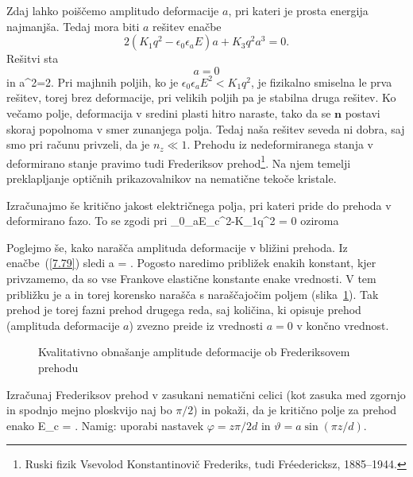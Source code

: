Zdaj lahko poiščemo amplitudo deformacije $a$, pri kateri je prosta energija
najmanjša. Tedaj mora biti $a$ rešitev enačbe 
\begin{equation}
2(K_{1}q^{2}-\epsilon_{0}\epsilon_{a}E)a+K_{3}q^{2}a^{3}=0.
\label{7.78}
\end{equation}
 Rešitvi sta 
\begin{equation}
a=0
\end{equation}
in
\beq
a^{2}=2.
\label{7.79}
\eeq
 Pri majhnih poljih, ko je $\epsilon_{0}\epsilon_{a}E^2<K_{1}q^{2}$,
je fizikalno smiselna le prva rešitev, torej brez deformacije, pri velikih poljih pa je  
stabilna druga rešitev. Ko večamo polje, deformacija
v sredini plasti hitro naraste, tako da se $\mathbf{n}$ postavi skoraj
popolnoma v smer zunanjega polja. Tedaj naša rešitev seveda ni dobra,
saj smo pri računu privzeli, da je $n_{z}\ll1$. Prehodu iz nedeformiranega
stanja v deformirano stanje pravimo tudi Frederiksov prehod\footnote{Ruski fizik
Vsevolod Konstantinovič Frederiks, tudi Fr\'{e}edericksz, 1885--1944.}. Na njem
temelji preklapljanje optičnih prikazovalnikov na nematične tekoče kristale.

Izračunajmo še kritično jakost električnega polja, pri kateri pride do prehoda v deformirano fazo.
To se zgodi pri 
\beq
\epsilon_{0}\epsilon_{a}E_c^2-K_{1}q^{2} = 0
\eeq
oziroma

Poglejmo še, kako narašča amplituda deformacije v bližini prehoda. Iz enačbe~(\ref{7.79})
sledi 
\beq
a = .
\eeq
Pogosto naredimo približek enakih konstant, kjer privzamemo, da so vse Frankove 
elastične konstante enake vrednosti. V tem približku je 
\beq
a \approx {}
\eeq
in torej korensko narašča s naraščajočim poljem (slika~\ref{Fred}). Tak prehod je torej
fazni prehod drugega reda, saj količina, ki opisuje prehod (amplituda deformacije $a$)
zvezno preide iz vrednosti $a=0$ v končno vrednost. 
\begin{figure}[h]
\centering
\def\svgwidth{80truemm} 

\caption{Kvalitativno obnašanje amplitude deformacije ob Frederiksovem prehodu}
\label{Fred}
\end{figure}

\begin{definition}
Izračunaj Frederiksov prehod v zasukani nematični celici (kot zasuka med zgornjo in spodnjo 
mejno ploskvijo naj bo $\pi/2$) in pokaži, da je kritično polje za prehod enako
\beq
E_c =  
.
\eeq
Namig: uporabi nastavek $\varphi = z \pi/2d$ in $\vartheta = a \sin(\pi z/d)$. 
\end{definition}

